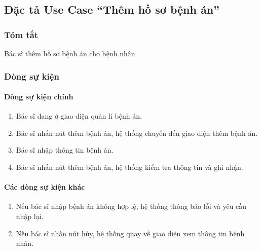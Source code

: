 \subsection{Đặc tả Use Case ``Thêm hồ sơ bệnh án''}

\subsubsection{Tóm tắt}
Bác sĩ thêm hồ sơ bệnh án cho bệnh nhân.

\subsubsection{Dòng sự kiện}
\paragraph{\textbf{Dòng sự kiện chính}}
\begin{enumerate}
  \item Bác sĩ đang ở giao diện quản lí bệnh án.
  \item Bác sĩ nhấn nút thêm bệnh án, hệ thống chuyển đến giao diện thêm bệnh án.
  \item Bác sĩ nhập thông tin bệnh án.
  \item Bác sĩ nhấn nút thêm bệnh án, hệ thống kiểm tra thông tin và ghi nhận.
\end{enumerate}

\paragraph{\textbf{Các dòng sự kiện khác}}
\begin{enumerate}
  \item Nếu bác sĩ nhập bệnh án không hợp lệ, hệ thống thông báo lỗi và yêu cầu nhập lại.
  \item Nếu bác sĩ nhấn nút hủy, hệ thống quay về giao diện xem thông tin bệnh nhân.
\end{enumerate}

